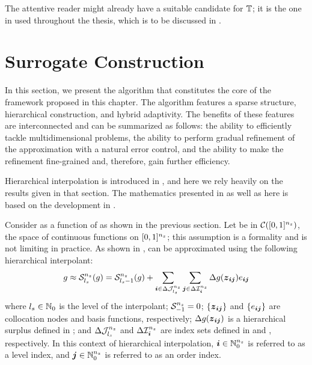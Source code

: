 The attentive reader might already have a suitable candidate for $\transform$;
it is the one in  used throughout the thesis,
which is to be discussed in .

\section{Surrogate Construction}

In this section, we present the algorithm that constitutes the core of the
framework proposed in this chapter. The algorithm features a sparse structure,
hierarchical construction, and hybrid adaptivity. The benefits of these features
are interconnected and can be summarized as follows: the ability to efficiently
tackle multidimensional problems, the ability to perform gradual refinement of
the approximation with a natural error control, and the ability to make the
refinement fine-grained and, therefore, gain further efficiency.

Hierarchical interpolation is introduced in , and
here we rely heavily on the results given in that section. The mathematics
presented in  as well as here is based on the
development in \cite{klimke2006, ma2009, jakeman2012}.

Consider \g as a function of \vz as shown in the previous section. Let \g be in
$\mathcal{C}([0, 1]^{n_{z}})$, the space of continuous functions on $[0, 1]^{n_{z}}$;
this assumption is a formality and is not limiting in practice. As shown in
, \g can be approximated using the following
hierarchical interpolant:
\[
  g \approx \mathcal{S}^{{n_{z}}}_{{l_{s}}}(g)
  = \mathcal{S}^{{n_{z}}}_{{l_{s}} - 1}(g) + \sum_{\boldsymbol{i} \in \Delta\mathcal{J}^{{n_{z}}}_{{l_{s}}}} \sum_{\boldsymbol{j} \in \Delta\mathcal{I}^{{n_{z}}}_{\boldsymbol{i}}} \Delta g(\boldsymbol{z}_{\boldsymbol{i} \boldsymbol{j}}) e_{\boldsymbol{i} \boldsymbol{j}}
\]
where ${l_{s}} \in \mathbb{N}_{0}$ is the level of the interpolant; $\mathcal{S}^{{n_{z}}}_{-1}
= 0$; $\{ \boldsymbol{z}_{\boldsymbol{i} \boldsymbol{j}} \}$ and $\{ e_{\boldsymbol{i} \boldsymbol{j}} \}$ are collocation nodes and
basis functions, respectively; $\Delta g(\boldsymbol{z}_{\boldsymbol{i} \boldsymbol{j}})$ is a hierarchical
surplus defined in ; and
$\Delta\mathcal{J}^{{n_{z}}}_{{l_{s}}}$ and $\Delta\mathcal{I}^{{n_{z}}}_{\boldsymbol{i}}$ are index sets
defined in  and
, respectively. In this context of
hierarchical interpolation, $\boldsymbol{i} \in \mathbb{N}_{0}^{n_{z}}$ is referred to as a level
index, and $\boldsymbol{j} \in \mathbb{N}_{0}^{n_{z}}$ is referred to as an order index.

